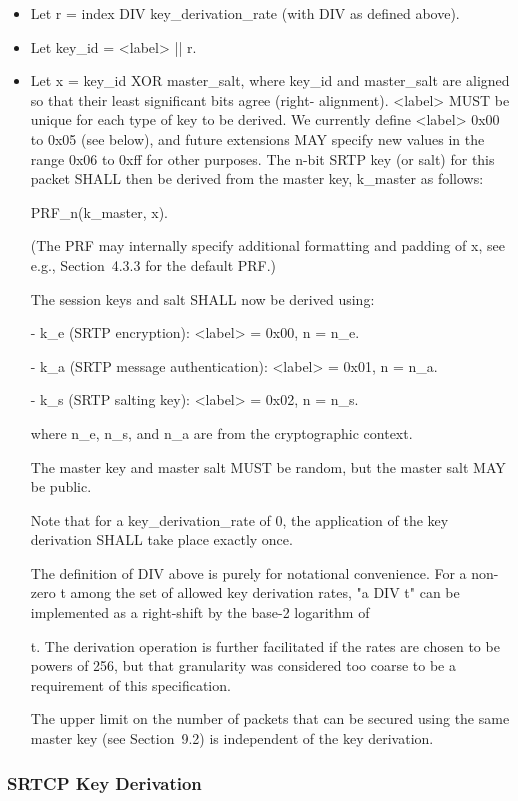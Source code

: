 \documentclass{article}
\begin{document}
\begin{itemize}
\item Let r = index DIV key\_derivation\_rate (with DIV as defined above).
\item Let key\_id = <label> || r.
\item Let x = key\_id XOR master\_salt, where key\_id and master\_salt are aligned so that their least significant bits agree (right- alignment).
<label> MUST be unique for each type of key to be derived.  We currently define <label> 0x00 to 0x05 (see below), and future extensions MAY specify new values in the range 0x06 to 0xff for other purposes.  The n-bit SRTP key (or salt) for this packet SHALL then be derived from the master key, k\_master as follows:

PRF\_n(k\_master, x).

(The PRF may internally specify additional formatting and padding of x, see e.g., Section~4.3.3 for the default PRF.)

The session keys and salt SHALL now be derived using:

- k\_e (SRTP encryption): <label> = 0x00, n = n\_e.

- k\_a (SRTP message authentication): <label> = 0x01, n = n\_a.

- k\_s (SRTP salting key): <label> = 0x02, n = n\_s.

where n\_e, n\_s, and n\_a are from the cryptographic context.

The master key and master salt MUST be random, but the master salt MAY be public.

Note that for a key\_derivation\_rate of 0, the application of the key derivation SHALL take place exactly once.

The definition of DIV above is purely for notational convenience. For a non-zero t among the set of allowed key derivation rates, "a DIV t" can be implemented as a right-shift by the base-2 logarithm of

t.  The derivation operation is further facilitated if the rates are chosen to be powers of 256, but that granularity was considered too coarse to be a requirement of this specification.

The upper limit on the number of packets that can be secured using the same master key (see Section~9.2) is independent of the key derivation.

\end{itemize}
\subsubsection{SRTCP Key Derivation}
\end{document}
